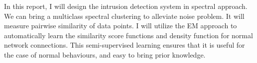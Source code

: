 In this report, I will design the intrusion detection system in spectral approach. 
We can bring a multiclass spectral clustering \cite{jianbo03} to alleviate noise problem. 
It will measure pairwise similarity of data points. %
I will utilize the EM approach to automatically learn the similarity score functions and density function for normal network connections. %
This semi-supervised learning ensures that it is useful for the case of normal behaviours, and easy to bring prior knowledge. 
